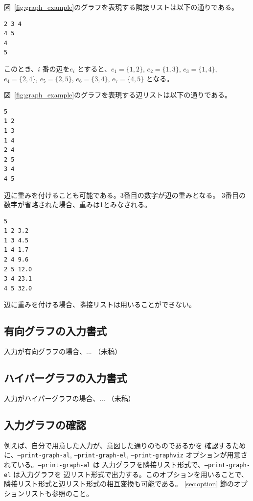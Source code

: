 \documentclass{jsarticle}
\begin{document}
図~\ref{fig:graph_example}のグラフを表現する隣接リストは以下の通りである。

\begin{verbatim}
2 3 4
4 5
4
5

\end{verbatim}

このとき、$i$ 番の辺を$e_i$ とすると、$e_1 = \{1, 2\}$, $e_2 = \{1, 3\}$, $e_3 = \{1, 4\}$,
$e_4 = \{2, 4\}$, $e_5 = \{2, 5\}$, $e_6 = \{3, 4\}$, $e_7 = \{4, 5\}$ となる。

図~\ref{fig:graph_example}のグラフを表現する辺リストは以下の通りである。

\begin{verbatim}
5
1 2
1 3
1 4
2 4
2 5
3 4
4 5
\end{verbatim}

辺に重みを付けることも可能である。3番目の数字が辺の重みとなる。
3番目の数字が省略された場合、重みは1とみなされる。

\begin{verbatim}
5
1 2 3.2
1 3 4.5
1 4 1.7
2 4 9.6
2 5 12.0
3 4 23.1
4 5 32.0
\end{verbatim}

辺に重みを付ける場合、隣接リストは用いることができない。

\subsection{有向グラフの入力書式}

入力が有向グラフの場合、... （未稿）

\subsection{ハイパーグラフの入力書式}

入力がハイパーグラフの場合、... （未稿）

\subsection{入力グラフの確認}

例えば、自分で用意した入力が、意図した通りのものであるかを
確認するために、\texttt{--print-graph-al}, \texttt{--print-graph-el},
\texttt{--print-graphviz} オプションが用意されている。\texttt{--print-graph-al} は
入力グラフを隣接リスト形式で、\texttt{--print-graph-el} は入力グラフを
辺リスト形式で出力する。このオプションを用いることで、
隣接リスト形式と辺リスト形式の相互変換も可能である。
\ref{sec:option} 節のオプションリストも参照のこと。
\end{document}
